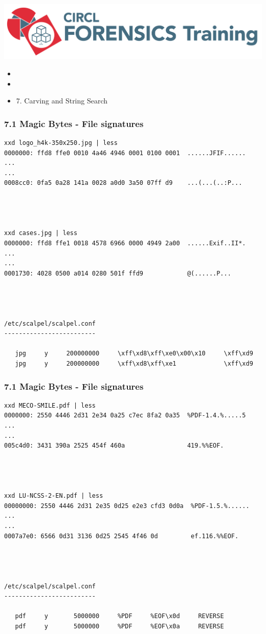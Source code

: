%
%



\begin{frame}
    \includegraphics[scale=0.3]{images/logo-circl-Forensics.png}
    \begin{itemize}
        \item[]
        \item[]
        \item[] 7. Carving and String Search
    \end{itemize}
\end{frame}


\begin{frame}[fragile]
  \frametitle{7.1 Magic Bytes - File signatures}
  \begin{lstlisting}[basicstyle=\tiny]
xxd logo_h4k-350x250.jpg | less
0000000: ffd8 ffe0 0010 4a46 4946 0001 0100 0001  ......JFIF......
...
...
0008cc0: 0fa5 0a28 141a 0028 a0d0 3a50 07ff d9    ...(...(..:P...




xxd cases.jpg | less
0000000: ffd8 ffe1 0018 4578 6966 0000 4949 2a00  ......Exif..II*.
...
...
0001730: 4028 0500 a014 0280 501f ffd9            @(......P...




/etc/scalpel/scalpel.conf
-------------------------

   jpg     y     200000000     \xff\xd8\xff\xe0\x00\x10     \xff\xd9
   jpg     y     200000000     \xff\xd8\xff\xe1             \xff\xd9

  \end{lstlisting}
\end{frame}


\begin{frame}[fragile]
  \frametitle{7.1 Magic Bytes - File signatures}
  \begin{lstlisting}[basicstyle=\tiny]
xxd MECO-SMILE.pdf | less
0000000: 2550 4446 2d31 2e34 0a25 c7ec 8fa2 0a35  %PDF-1.4.%.....5
...
...
005c4d0: 3431 390a 2525 454f 460a                 419.%%EOF.




xxd LU-NCSS-2-EN.pdf | less
00000000: 2550 4446 2d31 2e35 0d25 e2e3 cfd3 0d0a  %PDF-1.5.%......
...
...
0007a7e0: 6566 0d31 3136 0d25 2545 4f46 0d         ef.116.%%EOF.




/etc/scalpel/scalpel.conf
-------------------------

   pdf     y       5000000     %PDF     %EOF\x0d     REVERSE
   pdf     y       5000000     %PDF     %EOF\x0a     REVERSE

  \end{lstlisting}
\end{frame}


